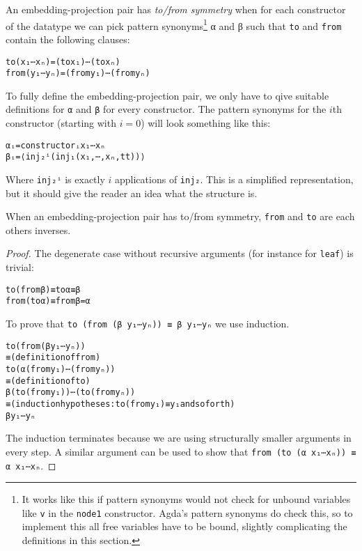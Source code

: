 \begin{definition}
An embedding-projection pair has \emph{to/from symmetry} when for each
constructor of the datatype we can pick pattern
synonyms\footnote{It works like this if pattern synonyms would not
  check for unbound variables like \texttt{v} in the \texttt{node1}
  constructor.
  Agda's pattern synonyms do check this, so to implement this all free
  variables have to be bound, slightly complicating the definitions in
  this section.}
α and β such that \texttt{to} and \texttt{from} contain the following
clauses:

\begin{alltt}
to  ( x₁⋯xₙ) =  (to  x₁)⋯(to  xₙ)
from  ( y₁⋯yₙ) =  (from  y₁)⋯(from  yₙ)
\end{alltt}
\end{definition}

To fully define the embedding-projection pair, we only have to qive
suitable definitions for \texttt{α} and \texttt{β} for every
constructor.
The pattern synonyms for the $i$th constructor (starting with $i=0$)
will look something like this:

\begin{alltt}
αᵢ = constructorᵢ x₁⋯xₙ
βᵢ = ⟨ inj₂ⁱ (inj₁ (x₁ , ⋯ , xₙ , tt)) ⟩
\end{alltt}

Where \texttt{inj₂ⁱ} is exactly $i$ applications of \texttt{inj₂}.
This is a simplified representation, but it should give the reader
an idea what the structure is.

\begin{theorem}
When an embedding-projection pair has to/from symmetry, \texttt{from}
and \texttt{to} are each others inverses.
\end{theorem}
\begin{proof}


The degenerate case without recursive arguments (for instance for
\texttt{leaf}) is trivial:

\begin{alltt}
to  (from  β) ≡ to  α ≡ β
from  (to  α) ≡ from  β = α
\end{alltt}

To prove that \texttt{to  (from  (β y₁⋯yₙ)) ≡ β
  y₁⋯yₙ} we use induction.

\begin{alltt}
to  (from  (β y₁⋯yₙ))
  ≡ (definition of from)
to  (α (from  y₁)⋯(from  yₙ))
  ≡ (definition of to)
β (to  (from  y₁))⋯(to  (from  yₙ))
  ≡ (induction hypotheses: to  (from  y₁) ≡ y₁ and so forth)
β y₁⋯yₙ
\end{alltt}

The induction terminates because we are using structurally smaller
arguments in every step.
A similar argument can be used to show that
\texttt{from  (to  (α x₁⋯xₙ)) ≡ α x₁⋯xₙ}.
\end{proof}

